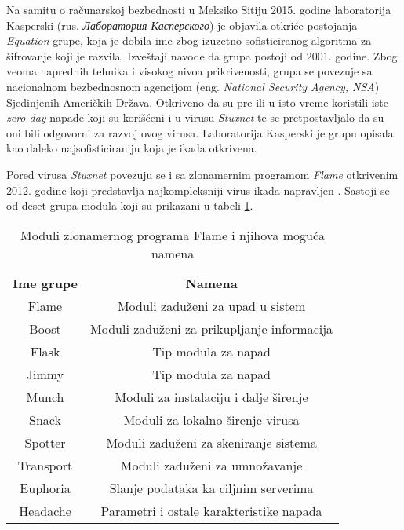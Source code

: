 \documentclass[a4paper]{article}
\begin{document}
Na samitu o računarskoj bezbednosti u Meksiko Sitiju 2015. godine laboratorija Kasperski (rus. \textit{Лаборатория Касперского}) je objavila otkriće postojanja \textit{Equation} grupe, koja je dobila ime zbog izuzetno sofisticiranog algoritma za šifrovanje koji je razvila. Izveštaji navode da grupa postoji od 2001. godine. Zbog veoma naprednih tehnika i visokog nivoa prikrivenosti, grupa se povezuje sa nacionalnom bezbednosnom agencijom (eng. \textit{National Security Agency, NSA}) Sjedinjenih Američkih Država. Otkriveno da su pre ili u isto vreme koristili iste \textit{zero-day} napade koji su korišćeni i u virusu \textit{Stuxnet} te se pretpostavljalo da su oni bili odgovorni za razvoj ovog virusa. Laboratorija Kasperski je grupu opisala kao daleko najsofisticiraniju koja je ikada otkrivena.

Pored virusa \textit{Stuxnet} povezuju se i sa zlonamernim programom \textit{Flame} otkrivenim 2012. godine koji predstavlja najkompleksniji virus ikada napravljen \cite{flame}. Sastoji se od deset grupa modula koji su prikazani u tabeli \ref{table:1}.

\begin{table}[h!]
\centering
\begin{tabular}{||c  c||} 
 \hline
 \textbf{Ime grupe} & \textbf{Namena} \\ 
 Flame & Moduli zaduženi za upad u sistem \\ 
 Boost & Moduli zaduženi za prikupljanje informacija \\
 Flask & Tip modula za napad \\
 Jimmy & Tip modula za napad \\
 Munch & Moduli za instalaciju i dalje širenje \\
 Snack & Moduli za lokalno širenje virusa \\
 Spotter & Moduli zaduženi za skeniranje sistema \\
 Transport & Moduli zaduženi za umnožavanje \\
 Euphoria & Slanje podataka ka ciljnim serverima \\
 Headache & Parametri i ostale karakteristike napada \\ [1ex] 
 \hline
\end{tabular}
\caption{Moduli zlonamernog programa Flame i njihova moguća namena}
\label{table:1}
\end{table}
\end{document}
